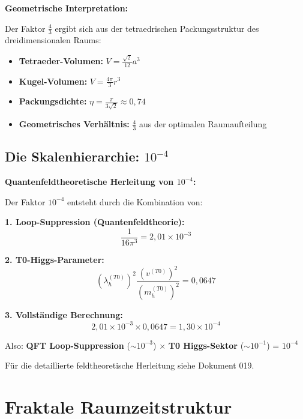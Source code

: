 \documentclass[12pt,a4paper]{article}
\begin{document}
	\begin{alternative}
		\textbf{Geometrische Interpretation:}
		
		Der Faktor $\frac{4}{3}$ ergibt sich aus der tetraedrischen Packungsstruktur des dreidimensionalen Raums:
		\begin{itemize}
			\item \textbf{Tetraeder-Volumen:} $V = \frac{\sqrt{2}}{12}a^3$
			\item \textbf{Kugel-Volumen:} $V = \frac{4\pi}{3}r^3$ 
			\item \textbf{Packungsdichte:} $\eta = \frac{\pi}{3\sqrt{2}} \approx 0{,}74$
			\item \textbf{Geometrisches Verhältnis:} $\frac{4}{3}$ aus der optimalen Raumaufteilung
		\end{itemize}
	\end{alternative}
	
	\subsection{Die Skalenhierarchie: $10^{-4}$}
	
	\begin{foundation}
		\textbf{Quantenfeldtheoretische Herleitung von $10^{-4}$:}
		
		Der Faktor $10^{-4}$ entsteht durch die Kombination von:
		
		\textbf{1. Loop-Suppression (Quantenfeldtheorie):}
		\begin{equation}
			\frac{1}{16\pi^3} = 2{,}01 \times 10^{-3}
		\end{equation}
		
		\textbf{2. T0-Higgs-Parameter:}
		\begin{equation}
			(\lambda_h^{(T0)})^2 \frac{(v^{(T0)})^2}{(m_h^{(T0)})^2} = 0{,}0647
		\end{equation}
		
		\textbf{3. Vollständige Berechnung:}
		\begin{equation}
			2{,}01 \times 10^{-3} \times 0{,}0647 = 1{,}30 \times 10^{-4}
		\end{equation}
		
		Also: \textbf{QFT Loop-Suppression} ($\sim 10^{-3}$) $\times$ \textbf{T0 Higgs-Sektor} ($\sim 10^{-1}$) = $10^{-4}$
		
		Für die detaillierte feldtheoretische Herleitung siehe Dokument 019.
	\end{foundation}
	
	\section{Fraktale Raumzeitstruktur}
	
\end{document}
